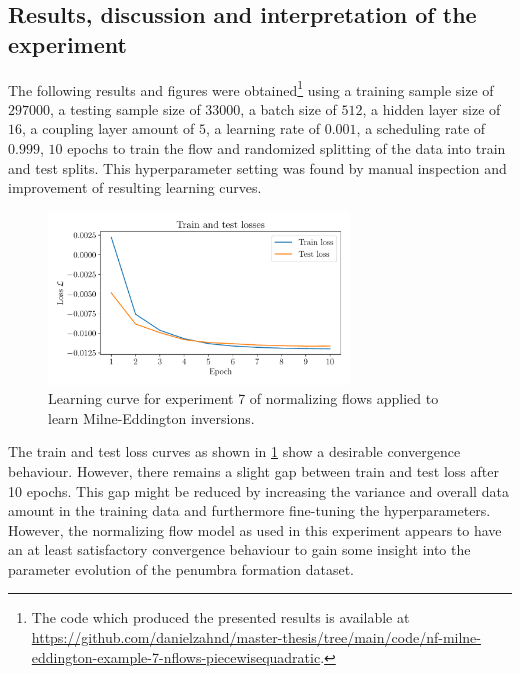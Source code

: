 \documentclass[a4paper,12pt]{report}
\begin{document}
\subsection{Results, discussion and interpretation of the experiment}
The following results and figures were obtained\footnote{The code which produced the presented results is available at \url{https://github.com/danielzahnd/master-thesis/tree/main/code/nf-milne-eddington-example-7-nflows-piecewisequadratic}.} using a training sample size of $297000$, a testing sample size of $33000$, a batch size of $512$, a hidden layer size of $16$, a coupling layer amount of $5$, a learning rate of $0.001$, a scheduling rate of $0.999$, $10$ epochs to train the flow and randomized splitting of the data into train and test splits. This hyperparameter setting was found by manual inspection and improvement of resulting learning curves.

\begin{figure}[h]
\centering
\includegraphics[width=8cm]{figures/nf-milne-eddington-example-7-loss-nflows-piecewisequadratic.pdf}
\caption{Learning curve for experiment 7 of normalizing flows applied to learn Milne-Eddington inversions.}
\label{fig:nf-milne-eddington-example-7-loss-nflows-piecewisequadratic}
\end{figure}

The train and test loss curves as shown in \cref{fig:nf-milne-eddington-example-7-loss-nflows-piecewisequadratic} show a desirable convergence behaviour. However, there remains a slight gap between train and test loss after 10 epochs. This gap might be reduced by increasing the variance and overall data amount in the training data and furthermore fine-tuning the hyperparameters. However, the normalizing flow model as used in this experiment appears to have an at least satisfactory convergence behaviour to gain some insight into the parameter evolution of the penumbra formation dataset.
\end{document}
